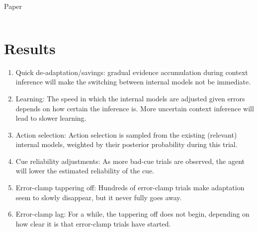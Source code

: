 \documentclass{report}
\begin{document}
\begin{chapter}{Paper}
\begin{tabularx}{\textwidth}{
  l|
  >{\hsize=0.4\hsize\linewidth=\hsize}X|
  >{\hsize=0.2\hsize\linewidth=\hsize}X|
  >{\hsize=0.2\hsize\linewidth=\hsize}X}
\end{tabularx}

\section{Results}

\begin{enumerate}
\item Quick de-adaptation/savings: gradual evidence accumulation during context inference will make the switching between internal models not be immediate.
\item Learning: The speed in which the internal models are adjusted given errors depends on how certain the inference is. More uncertain context inference will lead to slower learning.
\item Action selection: Action selection is sampled from the existing (relevant) internal models, weighted by their posterior probability during this trial.
\item Cue reliability adjustments: As more bad-cue trials are observed, the agent will lower the estimated reliability of the cue.
\item Error-clamp tappering off: Hundreds of error-clamp trials make adaptation seem to slowly disappear, but it never fully goes away.
\item Error-clamp lag: For a while, the tappering off does not begin, depending on how clear it is that error-clamp trials have started.
\end{enumerate}




\end{chapter}

\end{document}
